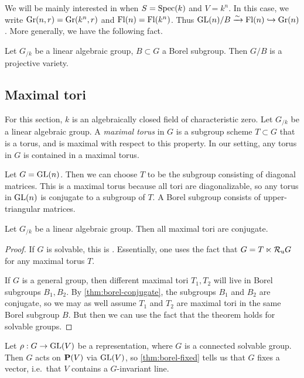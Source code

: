 We will be mainly interested in when $S=\operatorname{Spec}(k)$ and 
$V=k^n$. In this case, we write $\operatorname{Gr}(n,r)=\operatorname{Gr}(k^n,r)$ 
and $\operatorname{Fl}(n)=\operatorname{Fl}(k^n)$. Thus $\operatorname{GL}(n)/B\xrightarrow\sim \operatorname{Fl}(n)\hookrightarrow \operatorname{Gr}(n)$. 
More generally, we have the following fact. 

\begin{theorem}
Let $G_{/k}$ be a linear algebraic group, $B\subset G$ a Borel subgroup. Then 
$G/B$ is a projective variety. 
\end{theorem}






\subsection{Maximal tori}

For this section, $k$ is an algebraically closed field of characteristic 
zero. Let $G_{/k}$ be a linear algebraic group. A \emph{maximal torus} in 
$G$ is a subgroup scheme $T\subset G$ that is a torus, and is maximal with 
respect to this property. In our setting, any torus in $G$ is contained in a 
maximal torus. 


\begin{example}
Let $G=\operatorname{GL}(n)$. Then we can choose $T$ to be the subgroup consisting of 
diagonal matrices. This is a maximal torus because all tori are diagonalizable, 
so any torus in $\operatorname{GL}(n)$ is conjugate to a subgroup of $T$. A Borel subgroup 
consists of upper-triangular matrices. 
\end{example}

\begin{theorem}
Let $G_{/k}$ be a linear algebraic group. Then all maximal tori are conjugate. 
\end{theorem}
\begin{proof}
If $G$ is solvable, this is \cite[17.40]{milne-iAG}. Essentially, one uses 
the fact that $G=T\ltimes \mathcal{R}_\mathrm{u} G$ for any maximal torus $T$. 

If $G$ is a general group, then different maximal tori $T_1,T_2$ will live in 
Borel subgroups $B_1,B_2$. By \autoref{thm:borel-conjugate}, the subgroups 
$B_1$ and $B_2$ are conjugate, so we may as well assume $T_1$ and $T_2$ are 
maximal tori in the same Borel subgroup $B$. But then we can use the fact that 
the theorem holds for solvable groups. 
\end{proof}

\begin{example}
Let $\rho:G\to \operatorname{GL}(V)$ be a representation, where $G$ is a connected 
solvable group. Then $G$ acts on $\mathbf{P}(V)$ via $\operatorname{GL}(V)$, so 
\autoref{thm:borel-fixed} tells us that $G$ fixes a vector, i.e.~that 
$V$ contains a $G$-invariant line. 
\end{example}





